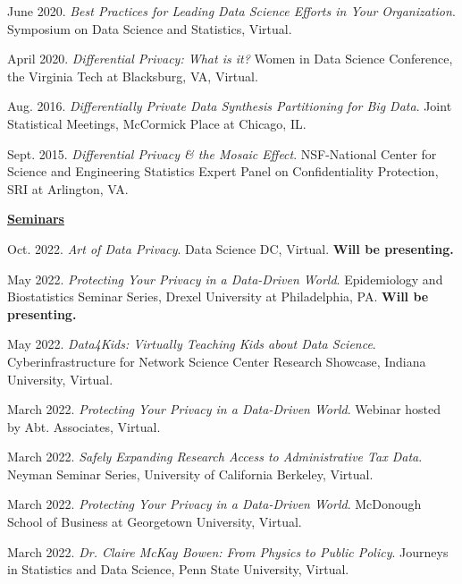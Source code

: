 \documentclass[11pt, letterpaper, roman]{moderncv} %
\begin{document}
\begin{etaremune}[topsep=0pt, itemsep=4pt, partopsep=0pt, parsep=0pt]
    \item June 2020. \textit{Best Practices for Leading Data Science Efforts in Your Organization}. Symposium on Data Science and Statistics, Virtual.
  
    \item April 2020. \textit{Differential Privacy: What is it?} Women in Data Science Conference, the Virginia Tech at Blacksburg, VA, Virtual.

    \item Aug. 2016. \textit{Differentially Private Data Synthesis Partitioning for Big Data}. Joint Statistical Meetings, McCormick Place at Chicago, IL.
    
    \item Sept. 2015. \textit{Differential Privacy \& the Mosaic Effect}. NSF-National Center for Science and Engineering Statistics Expert Panel on Confidentiality Protection, SRI at Arlington, VA.

\vspace{6pt}
\hspace{-0.30in}\underline{\textbf{\large Seminars}}\normalsize
    \item Oct. 2022. \textit{Art of Data Privacy}. Data Science DC, Virtual. \textbf{Will be presenting.}
    
    \item May 2022. \textit{Protecting Your Privacy in a Data-Driven World}. Epidemiology and Biostatistics Seminar Series, Drexel University at Philadelphia, PA. \textbf{Will be presenting.}
    
    \item May 2022. \textit{Data4Kids: Virtually Teaching Kids about Data Science}. Cyberinfrastructure for Network Science Center Research Showcase, Indiana University, Virtual.
    
    \item March 2022. \textit{Protecting Your Privacy in a Data-Driven World}. Webinar hosted by Abt. Associates, Virtual.
    
    \item March 2022. \textit{Safely Expanding Research Access to Administrative Tax Data}. Neyman Seminar Series, University of California Berkeley, Virtual.
    
    \item March 2022. \textit{Protecting Your Privacy in a Data-Driven World}. McDonough School of Business at Georgetown University, Virtual.
    
    \item March 2022. \textit{Dr. Claire McKay Bowen: From Physics to Public Policy}. Journeys in Statistics and Data Science, Penn State University, Virtual.
        

\end{etaremune}
\end{document}

